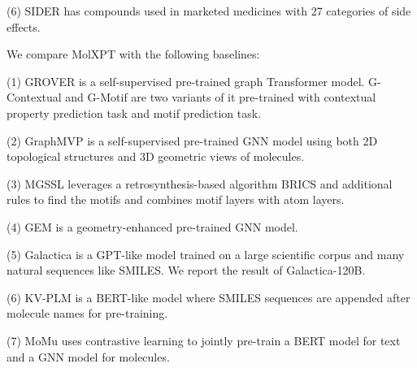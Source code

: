 \documentclass[11pt]{article}
\newcommand{\ourM}{MolXPT}
\begin{document}
\noindent(6) SIDER has compounds used in marketed medicines with 27 categories of side effects. 

\noindent We compare \ourM{} with the following baselines:

\noindent(1) GROVER is a self-supervised pre-trained graph Transformer model. G-Contextual and G-Motif are two variants of it pre-trained with contextual property prediction task and motif prediction task.

\noindent(2) GraphMVP is a self-supervised pre-trained GNN model using both 2D topological structures and 3D geometric views of molecules.
    
\noindent(3) MGSSL leverages a
retrosynthesis-based algorithm BRICS and additional rules to find the motifs and combines motif layers with atom layers.

\noindent(4) GEM is a geometry-enhanced pre-trained GNN model.
    
\noindent(5) {Galactica} is a GPT-like model trained on a large scientific corpus and many natural sequences like SMILES. We report the result of Galactica-120B.

\noindent(6) {KV-PLM} is a BERT-like model where SMILES sequences are appended
after molecule names for pre-training.

\noindent(7) MoMu uses contrastive learning to jointly pre-train a BERT model for text and a GNN model for molecules.

\iffalse
\subsection{Evaluation metrics for text from-to molecule generation}
\label{sec:textmol}
\textbf{Metrics for molecule-to-text generation.} \textbf{BLEU} \cite{bleu}, \textbf{Rouge} \cite{rouge} and \textbf{METEOR} \cite{meteor} are text generation metrics evaluating the overlap between the generated text and ground truth. \textbf{Text2mol} is a metric proposed by \cite{molt5} using a pre-trained MLP to generate similarities of the candidate molecule-description pairs.

\textbf{Metrics for text-to-molecule generation.} \textbf{BLEU} and \textbf{Levenshtein} distance \cite{levenshtein} are metrics to evaluate the SMILES sequence overlap between generated molecule and ground truth. \textbf{Exact} is the proportion of generations exactly matching ground truth. MACCS \cite{maccs}, RDK \cite{rdk} and Morgan \cite{morgan} are the fingerprint Tanimoto similarity with different fingerprinting methods. \textbf{FCD} \cite{fcd} is based on the penultimate layer of ``ChemNet'', allowing molecules to be compared based on the latent information required to predict useful properties. \textbf{Text2mol} evaluates the distance of the generated molecule to the given description.  \textbf{Validity} is the proportion of the syntactically valid SMILES in all the generated SMILES.
\fi
\end{document}
